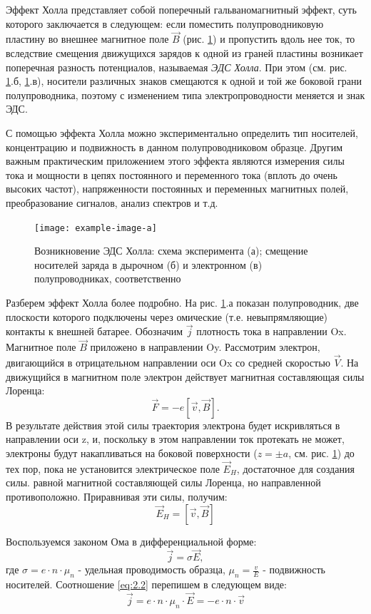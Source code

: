 Эффект Холла представляет собой поперечный гальваномагнитный эффект, суть которого заключается в следующем: если поместить полупроводниковую пластину во внешнее магнитное поле $\vec B$ (рис. \ref{fig:8}) и пропустить вдоль нее ток, то вследствие смещения движущихся зарядов к одной из граней пластины возникает поперечная разность потенциалов, называемая \textit{ЭДС Холла}. При этом (см. рис. \ref{fig:8}.б, \ref{fig:8}.в), носители различных знаков смещаются к одной и той же боковой грани полупроводника, поэтому с изменением типа электропроводности меняется и знак ЭДС.

С помощью эффекта Холла можно экспериментально определить тип носителей, концентрацию и подвижность в данном полупроводниковом образце. Другим важным практическим приложением этого эффекта являются измерения силы тока и мощности в цепях постоянного и переменного тока  (вплоть до очень высоких частот), напряженности постоянных и переменных магнитных полей, преобразование сигналов, анализ спектров и т.д.

\begin{figure}[h!]
	\centering
	\texttt{[image: example-image-a]}
	\caption{Возникновение ЭДС Холла: схема эксперимента (а); смещение носителей заряда в дырочном (б) и электронном (в) полупроводниках, соответственно}
	\label{fig:8}
\end{figure}

Разберем эффект Холла более подробно. На рис. \ref{fig:8}.а показан полупроводник, две плоскости которого подключены через омические (т.е. невыпрямляющие) контакты к внешней батарее. Обозначим $\vec j$ плотность тока в направлении Ox. Магнитное поле $\vec B$ приложено в направлении Oy. Рассмотрим электрон, двигающийся в отрицательном направлении оси Ox со средней скоростью $\vec V$. На движущийся в магнитном поле электрон действует магнитная составляющая силы Лоренца:
$$\vec F = -e [\vec v, \vec B].$$
В результате действия этой силы траектория электрона будет искривляться  в направлении оси z, и, поскольку в этом направлении ток протекать не может, электроны будут накапливаться на боковой поверхности ($z=\pm a$, см. рис. \ref{fig:8}) до тех пор, пока не установится электрическое поле $\vec E_H$, достаточное для создания силы. равной магнитной составляющей силы Лоренца, но направленной противоположно. Приравнивая эти силы, получим: 
\begin{equation}
\label{eq:2.1}
	\vec E_H=[\vec v, \vec B]
\end{equation}

Воспользуемся законом Ома в дифференциальной форме:
\begin{equation}
\label{eq:2.2}
	\vec j = \sigma \vec E,
\end{equation}
где $\sigma = e \cdot n \cdot \mu_n$ - удельная проводимость образца, $\mu_n = \frac{v}{E}$ - подвижность носителей. Соотношение \eqref{eq:2.2} перепишем в следующем виде:
\begin{equation}
\label{eq:2.3}
	\vec j = e \cdot n \cdot \mu_n \cdot \vec E = -e \cdot n \cdot \vec v
\end{equation}

